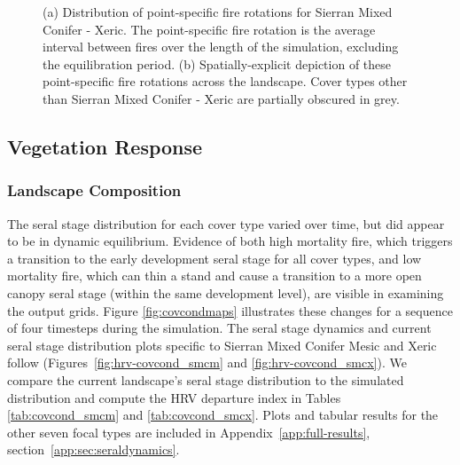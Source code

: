 \begin{figure}[!htbp]
  \centering
  \caption{(a) Distribution of point-specific fire rotations for Sierran Mixed Conifer - Xeric. The point-specific fire rotation is the average interval between fires over the length of the simulation, excluding the equilibration period. (b) Spatially-explicit depiction of these point-specific fire rotations across the landscape. Cover types other than Sierran Mixed Conifer - Xeric are partially obscured in grey.}
\label{fig:preturn_smcx}
\end{figure}

\clearpage



\subsection{Vegetation Response}
\label{subsec:HRVvegresponse}


\subsubsection{Landscape Composition} 

The seral stage distribution for each cover type varied over time, but did appear to be in dynamic equilibrium. Evidence of both high mortality fire, which triggers a transition to the early development seral stage for all cover types, and low mortality fire, which can thin a stand and cause a transition to a more open canopy seral stage (within the same development level), are visible in examining the output grids. Figure \ref{fig:covcondmaps} illustrates these changes for a sequence of four timesteps during the simulation. The seral stage dynamics and current seral stage distribution plots specific to Sierran Mixed Conifer Mesic and Xeric follow (Figures~\ref{fig:hrv-covcond_smcm} and \ref{fig:hrv-covcond_smcx}). We compare the current landscape's seral stage distribution to the simulated distribution and compute the HRV departure index in Tables \ref{tab:covcond_smcm} and \ref{tab:covcond_smcx}. Plots and tabular results for the other seven focal types are included in Appendix~\ref{app:full-results}, section~\ref{app:sec:seraldynamics}.

